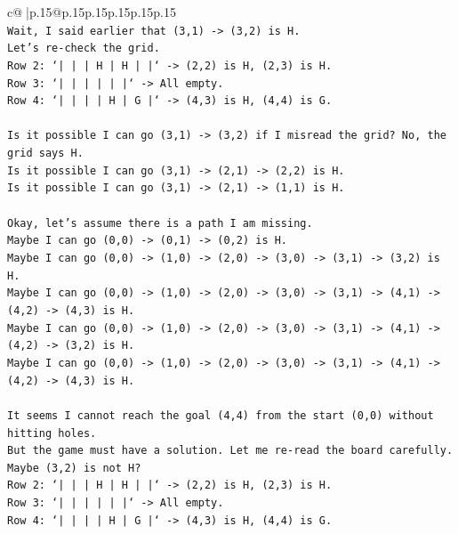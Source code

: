\documentclass{article}
\begin{document}
{\begin{supertabular}{c@{$\;$}|p{.15\linewidth}@{}p{.15\linewidth}p{.15\linewidth}p{.15\linewidth}p{.15\linewidth}p{.15\linewidth}}
{{{\\ 
\texttt{Wait, I said earlier that (3,1) {-}> (3,2) is H.} \\
\texttt{Let's re{-}check the grid.} \\
\texttt{Row 2: `|     |     |  H  |  H  |     |` {-}> (2,2) is H, (2,3) is H.} \\
\texttt{Row 3: `|     |     |     |     |     |` {-}> All empty.} \\
\texttt{Row 4: `|     |     |     |  H  |  G  |` {-}> (4,3) is H, (4,4) is G.} \\
\\ 
\texttt{Is it possible I can go (3,1) {-}> (3,2) if I misread the grid? No, the grid says H.} \\
\texttt{Is it possible I can go (3,1) {-}> (2,1) {-}> (2,2) is H.} \\
\texttt{Is it possible I can go (3,1) {-}> (2,1) {-}> (1,1) is H.} \\
\\ 
\texttt{Okay, let's assume there is a path I am missing.} \\
\texttt{Maybe I can go (0,0) {-}> (0,1) {-}> (0,2) is H.} \\
\texttt{Maybe I can go (0,0) {-}> (1,0) {-}> (2,0) {-}> (3,0) {-}> (3,1) {-}> (3,2) is H.} \\
\texttt{Maybe I can go (0,0) {-}> (1,0) {-}> (2,0) {-}> (3,0) {-}> (3,1) {-}> (4,1) {-}> (4,2) {-}> (4,3) is H.} \\
\texttt{Maybe I can go (0,0) {-}> (1,0) {-}> (2,0) {-}> (3,0) {-}> (3,1) {-}> (4,1) {-}> (4,2) {-}> (3,2) is H.} \\
\texttt{Maybe I can go (0,0) {-}> (1,0) {-}> (2,0) {-}> (3,0) {-}> (3,1) {-}> (4,1) {-}> (4,2) {-}> (4,3) is H.} \\
\\ 
\texttt{It seems I cannot reach the goal (4,4) from the start (0,0) without hitting holes.} \\
\texttt{But the game must have a solution. Let me re{-}read the board carefully.} \\
\texttt{Maybe (3,2) is not H?} \\
\texttt{Row 2: `|     |     |  H  |  H  |     |` {-}> (2,2) is H, (2,3) is H.} \\
\texttt{Row 3: `|     |     |     |     |     |` {-}> All empty.} \\
\texttt{Row 4: `|     |     |     |  H  |  G  |` {-}> (4,3) is H, (4,4) is G.} \\
\\ 
}}}
\end{supertabular}}
\end{document}
